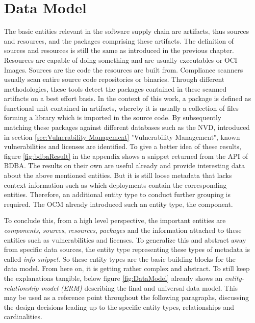 \section{Data Model} \label{sec:Data Model}
The basic entities relevant in the software supply chain are artifacts, thus sources and resources, and the packages comprising these artifacts. The definition of sources and resources is still the same as introduced in the previous chapter. Resources are capable of doing something and are usually executables or OCI Images. Sources are the code the resources are built from. Compliance scanners usually scan entire source code repositories or binaries. Through different methodologies, these tools detect the packages contained in these scanned artifacts on a best effort basis. In the context of this work, a package is defined as functional unit contained in artifacts, whereby it is usually a collection of files forming a library which is imported in the source code. By subsequently matching these packages against different databases such as the NVD, introduced in section \ref{sec:Vulnerability Management} "Vulnerability Management", known vulnerabilities and licenses are identified. To give a better idea of these results, figure \ref{fig:bdbaResult} in the appendix shows a snippet returned from the API of BDBA. The results on their own are useful already and provide interesting data about the above mentioned entities. But it is still loose metadata that lacks context information such as which deployments contain the corresponding entities. Therefore, an additional entity type to conduct further grouping is required. The OCM already introduced such an entity type, the component.\par
To conclude this, from a high level perspective, the important entities are \emph{components}, \emph{sources}, \emph{resources}, \emph{packages} and the information attached to these entities such as vulnerabilities and licenses. To generalize this and abstract away from specific data sources, the entity type representing these types of metadata is called \emph{info snippet}. So these entity types are the basic building blocks for the data model. From here on, it is getting rather complex and abstract. To still keep the explanations tangible, below figure \ref{fig:DataModel} already shows an \emph{entity-relationship model (ERM)} describing the final and universal data model. This may be used as a reference point throughout the following paragraphs, discussing the design decisions leading up to the specific entity types, relationships and cardinalities.

